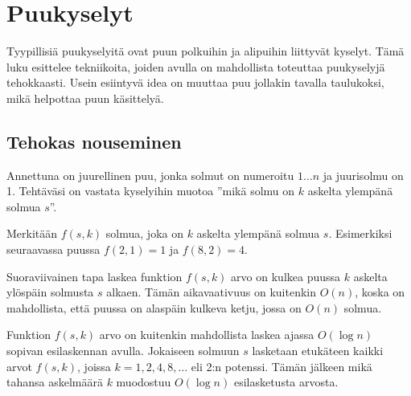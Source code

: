 \chapter{Puukyselyt}

Tyypillisiä puukyselyitä ovat
puun polkuihin ja alipuihin
liittyvät kyselyt.
Tämä luku esittelee
tekniikoita, joiden avulla on mahdollista
toteuttaa puukyselyjä tehokkaasti.
Usein esiintyvä idea on muuttaa
puu jollakin tavalla taulukoksi,
mikä helpottaa puun käsittelyä.

\section{Tehokas nouseminen}

\begin{task}
Annettuna on juurellinen puu, jonka solmut on numeroitu
$1 \ldots n$ ja juurisolmu on 1.
Tehtäväsi on vastata
kyselyihin muotoa ''mikä solmu on
$k$ askelta ylempänä solmua $s$''.
\end{task}

Merkitään $f(s,k)$ solmua,
joka on $k$ askelta ylempänä solmua $s$.
Esimerkiksi seuraavassa puussa
$f(2,1)=1$ ja $f(8,2)=4$.

\begin{center}
\end{center}

Suoraviivainen tapa laskea funktion $f(s,k)$
arvo on kulkea puussa $k$ askelta ylöspäin
solmusta $s$ alkaen.
Tämän aikavaativuus on kuitenkin $O(n)$,
koska on mahdollista, että puussa on alaspäin
kulkeva ketju, jossa on $O(n)$ solmua.

Funktion $f(s,k)$ arvo on kuitenkin mahdollista
laskea ajassa $O(\log n)$ sopivan esilaskennan avulla.
Jokaiseen solmuun $s$ lasketaan
etukäteen kaikki arvot
$f(s,k)$, joissa $k=1,2,4,8,\ldots$ eli 2:n potenssi.
Tämän jälkeen mikä tahansa askelmäärä $k$
muodostuu $O(\log n)$ esilasketusta arvosta.

